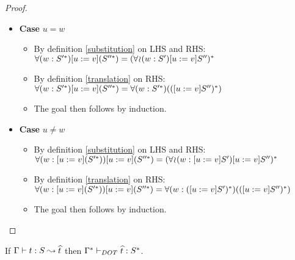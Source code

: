 \begin{proof}
\begin{itemize}
\begin{itemize}
            \item \textbf{Case} $u = w$
            \begin{itemize}
                \item By definition \ref{substitution} on LHS and RHS:
                    $\forall(w:S'^{*})[u := v](S''^{*}) =
                    (\forall\!\wr\!(w:S')[u := v]S'')^{*}$
                \item By definition \ref{translation} on RHS: \\
                    $\forall(w:S'^{*})[u := v](S''^{*}) =
                    \forall(w:S'^{*})(([u := v]S'')^{*})$
                \item The goal then follows by induction.
            \end{itemize}
            \item \textbf{Case} $u \neq w$
            \begin{itemize}
                \item By definition \ref{substitution} on LHS and RHS: \\
                    $\forall(w:[u := v](S'^{*}))[u := v](S''^{*}) =
                    (\forall\!\wr\!(w:[u := v]S')[u := v]S'')^{*}$
                \item By definition \ref{translation} on RHS: \\
                    $\forall(w:[u := v](S'^{*}))[u := v](S''^{*}) =
                    \forall(w:([u := v]S')^{*})(([u := v]S'')^{*})$
                \item The goal then follows by induction.
            \end{itemize}
        \end{itemize}
    \end{itemize}
\end{proof}

\begin{THEOREM}
    \label{tp_terms}
    If $\Gamma \vdash t: S \leadsto \widehat{t}$ then
    $\Gamma^{*} \vdash_{DOT} \widehat{t}: S^{*}$.
\end{THEOREM}

